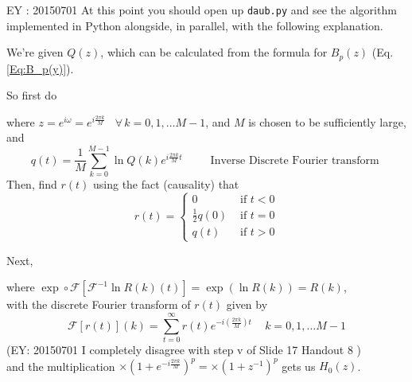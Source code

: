 \documentclass[twoside]{amsart}
\theoremstyle{plain}
\theoremstyle{definition}
\theoremstyle{remark}
\numberwithin{equation}{section}
\begin{document}
EY : 20150701 At this point you should open up \verb|daub.py| and see the algorithm implemented in Python alongside, in parallel, with the following explanation.  

We're given $Q(z)$, which can be calculated from the formula for $B_p(z)$ (Eq. \ref{Eq:B_p(y)}).  

So first do


where $z=e^{i\omega} = e^{i\frac{2\pi k}{M}}$ \, $\forall \, k = 0, 1, \dots M-1$, and $M$ is chosen to be sufficiently large, and 
\[
q(t) = \frac{1}{M} \sum_{k=0}^{M-1} \ln{ Q(k)}e^{ i \frac{2\pi k}{M} t} \quad \quad \, \text{ Inverse Discrete Fourier transform }
\]
Then, find $r(t)$ using the fact (causality) that 
\[
r(t) = \begin{cases} 0 & \text{ if } t < 0 \\
  \frac{1}{2} q(0) & \text{ if } t = 0 \\
  q(t) & \text{ if } t > 0 \end{cases}
\]

Next, 


where $\exp \circ \mathcal{F}[ \mathcal{F}^{-1}\ln{ R(k)(t)}] = \exp{ ( \ln{ R(k) } ) } = R(k)$, \\
\phantom{where} with the discrete Fourier transform of $r(t)$ given by 
\[
\mathcal{F}[r(t)](k) = \sum_{t=0}^{\infty} r(t) e^{ -i \left( \frac{2\pi k}{M} \right) t } \quad \, k = 0,1, \dots M-1
\] \phantom{where with }(EY: 20150701 I completely disagree with step v of Slide 17 Handout 8 \cite{GStrangKAmaratunga2003}) \\
\phantom{where} and the multiplication $\times (1 + e^{-i \frac{2\pi k}{M}})^p = \times (1+z^{-1})^p$ gets us $H_0(z)$.   
\end{document}
